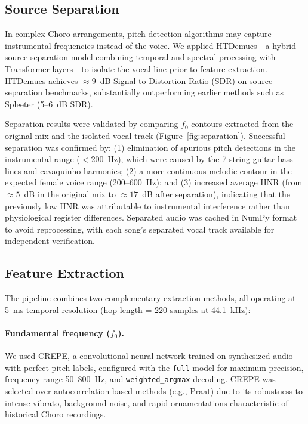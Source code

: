 \documentclass[review,3p,number]{elsarticle}
\begin{document}
\subsection{Source Separation}
\label{sec:separation}

In complex Choro arrangements, pitch detection algorithms may capture instrumental
frequencies instead of the voice. We applied HTDemucs\cite{rouard2023}---a hybrid
source separation model combining temporal and spectral processing with Transformer
layers---to isolate the vocal line prior to feature extraction. HTDemucs achieves
$\approx 9$~dB Signal-to-Distortion Ratio (SDR) on source separation benchmarks,
substantially outperforming earlier methods such as Spleeter (5--6~dB SDR).

Separation results were validated by comparing $f_0$ contours extracted from the
original mix and the isolated vocal track (Figure~\ref{fig:separation}). Successful
separation was confirmed by: (1) elimination of spurious pitch detections in the
instrumental range ($< 200$~Hz), which were caused by the 7-string guitar bass lines
and cavaquinho harmonics; (2) a more continuous melodic contour in the expected
female voice range (200--600~Hz); and (3) increased average HNR (from $\approx 5$~dB
in the original mix to $\approx 17$~dB after separation), indicating that the
previously low HNR was attributable to instrumental interference rather than
physiological register differences. Separated audio was cached in NumPy format to
avoid reprocessing, with each song's separated vocal track available for independent
verification.

\subsection{Feature Extraction}
\label{sec:features}

The pipeline combines two complementary extraction methods, all operating at 5~ms
temporal resolution (hop length = 220 samples at 44.1~kHz):

\paragraph{Fundamental frequency ($f_0$).}
We used CREPE,\cite{kim2018} a convolutional neural network trained on synthesized
audio with perfect pitch labels, configured with the \texttt{full} model for maximum precision, frequency
range 50--800~Hz, and \texttt{weighted\_argmax} decoding. CREPE was selected over
autocorrelation-based methods (e.g., Praat) due to its robustness to intense
vibrato, background noise, and rapid ornamentations characteristic of historical
Choro recordings.
\end{document}
